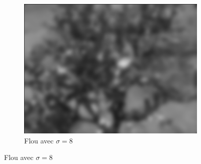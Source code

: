 \begin{enumerate}[questions, start=11]
\begin{figure}[!h]
\begin{subfigure}{0.3\textwidth}
  \includegraphics[width=\textwidth]{img/grove-blur-8.png}
  \caption{Flou avec $\sigma = 8$}
  \end{subfigure}
\end{figure}
\end{enumerate}

